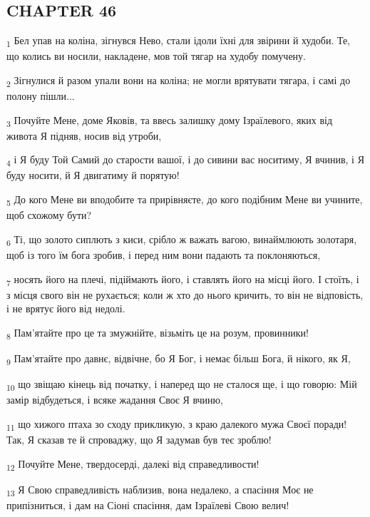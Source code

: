 \subsection{CHAPTER 46}
\begin{tcolorbox}
\textsubscript{1} Бел упав на коліна, зігнувся Нево, стали ідоли їхні для звірини й худоби. Те, що колись ви носили, накладене, мов той тягар на худобу помучену.
\end{tcolorbox}
\begin{tcolorbox}
\textsubscript{2} Зігнулися й разом упали вони на коліна; не могли врятувати тягара, і самі до полону пішли...
\end{tcolorbox}
\begin{tcolorbox}
\textsubscript{3} Почуйте Мене, доме Яковів, та ввесь залишку дому Ізраїлевого, яких від живота Я підняв, носив від утроби,
\end{tcolorbox}
\begin{tcolorbox}
\textsubscript{4} і Я буду Той Самий до старости вашої, і до сивини вас носитиму, Я вчинив, і Я буду носити, й Я двигатиму й порятую!
\end{tcolorbox}
\begin{tcolorbox}
\textsubscript{5} До кого Мене ви вподобите та прирівняєте, до кого подібним Мене ви учините, щоб схожому бути?
\end{tcolorbox}
\begin{tcolorbox}
\textsubscript{6} Ті, що золото сиплють з киси, срібло ж важать вагою, винаймлюють золотаря, щоб із того їм бога зробив, і перед ним вони падають та поклоняються,
\end{tcolorbox}
\begin{tcolorbox}
\textsubscript{7} носять його на плечі, підіймають його, і ставлять його на місці його. І стоїть, і з місця свого він не рухається; коли ж хто до нього кричить, то він не відповість, і не врятує його від недолі.
\end{tcolorbox}
\begin{tcolorbox}
\textsubscript{8} Пам'ятайте про це та змужнійте, візьміть це на розум, провинники!
\end{tcolorbox}
\begin{tcolorbox}
\textsubscript{9} Пам'ятайте про давнє, відвічне, бо Я Бог, і немає більш Бога, й нікого, як Я,
\end{tcolorbox}
\begin{tcolorbox}
\textsubscript{10} що звіщаю кінець від початку, і наперед що не сталося ще, і що говорю: Мій замір відбудеться, і всяке жадання Своє Я вчиню,
\end{tcolorbox}
\begin{tcolorbox}
\textsubscript{11} що хижого птаха зо сходу прикликую, з краю далекого мужа Своєї поради! Так, Я сказав те й спроваджу, що Я задумав був теє зроблю!
\end{tcolorbox}
\begin{tcolorbox}
\textsubscript{12} Почуйте Мене, твердосерді, далекі від справедливости!
\end{tcolorbox}
\begin{tcolorbox}
\textsubscript{13} Я Свою справедливість наблизив, вона недалеко, а спасіння Моє не припізниться, і дам на Сіоні спасіння, дам Ізраїлеві Свою велич!
\end{tcolorbox}
